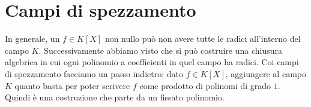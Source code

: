 \section{Campi di spezzamento}

%
%

In generale, un $f \in K[X]$ non nullo può non avere tutte le radici all'interno del campo $K$. Successivamente abbiamo visto che si può costruire una chiusura algebrica in cui ogni polinomio a coefficienti in quel campo ha radici. Coi campi di spezzamento facciamo un passo indietro: dato $f \in K[X]$, aggiungere al campo $K$ quanto basta per poter scrivere $f$ come prodotto di polinomi di grado $1$. Quindi è una costruzione che parte da un fissato polinomio.

